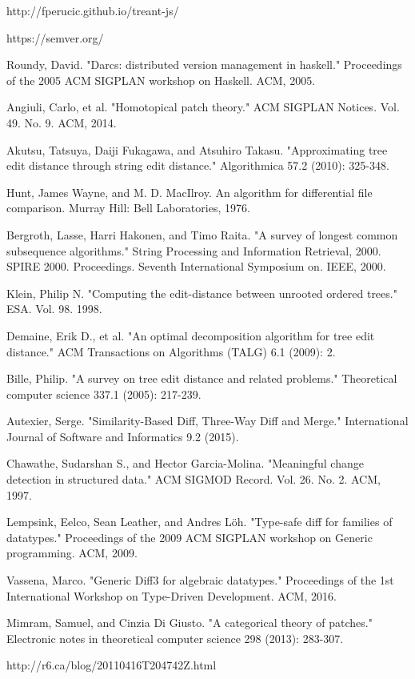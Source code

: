 \documentclass[11pt, titlepage]{article}
\begin{document}
\begin{thebibliography}{30}
 http://fperucic.github.io/treant-js/

 https://semver.org/

 Roundy, David. "Darcs: distributed version management in haskell." Proceedings of the 2005 ACM SIGPLAN workshop on Haskell. ACM, 2005.

 Angiuli, Carlo, et al. "Homotopical patch theory." ACM SIGPLAN Notices. Vol. 49. No. 9. ACM, 2014.

 Akutsu, Tatsuya, Daiji Fukagawa, and Atsuhiro Takasu. "Approximating tree edit distance through string edit distance." Algorithmica 57.2 (2010): 325-348.

 Hunt, James Wayne, and M. D. MacIlroy. An algorithm for differential file comparison. Murray Hill: Bell Laboratories, 1976.

 Bergroth, Lasse, Harri Hakonen, and Timo Raita. "A survey of longest common subsequence algorithms." String Processing and Information Retrieval, 2000. SPIRE 2000. Proceedings. Seventh International Symposium on. IEEE, 2000.

 Klein, Philip N. "Computing the edit-distance between unrooted ordered trees." ESA. Vol. 98. 1998.

 Demaine, Erik D., et al. "An optimal decomposition algorithm for tree edit distance." ACM Transactions on Algorithms (TALG) 6.1 (2009): 2.

 Bille, Philip. "A survey on tree edit distance and related problems." Theoretical computer science 337.1 (2005): 217-239.

 Autexier, Serge. "Similarity-Based Diff, Three-Way Diff and Merge." International Journal of Software and Informatics 9.2 (2015).

 Chawathe, Sudarshan S., and Hector Garcia-Molina. "Meaningful change detection in structured data." ACM SIGMOD Record. Vol. 26. No. 2. ACM, 1997.

 Lempsink, Eelco, Sean Leather, and Andres Löh. "Type-safe diff for families of datatypes." Proceedings of the 2009 ACM SIGPLAN workshop on Generic programming. ACM, 2009.

 Vassena, Marco. "Generic Diff3 for algebraic datatypes." Proceedings of the 1st International Workshop on Type-Driven Development. ACM, 2016.

 Mimram, Samuel, and Cinzia Di Giusto. "A categorical theory of patches." Electronic notes in theoretical computer science 298 (2013): 283-307.

 http://r6.ca/blog/20110416T204742Z.html
\end{thebibliography}
\end{document}
